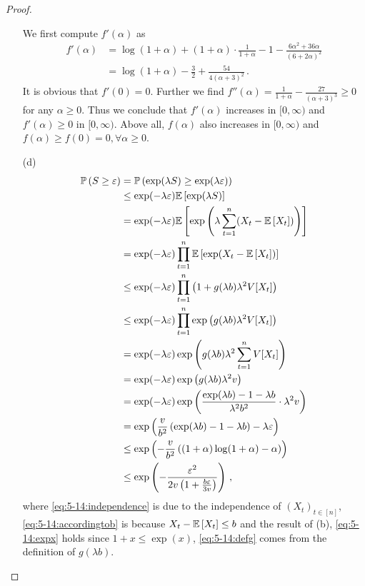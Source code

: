 \begin{proof}
\begin{enumerate}
		We first compute $f'(\alpha)$ as
		\begin{align*}
			f'(\alpha) &= \log(1+\alpha) + (1+\alpha)\cdot \frac{1}{1+\alpha} -1 - \frac{6\alpha^2 + 36 \alpha}{(6+2\alpha)^2} \\
			&= \log(1+\alpha) - \frac{3}{2} + \frac{54}{4 (\alpha+3)^2}\,. 
		\end{align*}
		It is obvious that $f'(0)=0$. Further we find $f''(\alpha) = \frac{1}{1+\alpha} - \frac{27}{(\alpha+3)^3} \ge 0$ for any $\alpha\ge 0$. Thus we conclude that $f'(\alpha)$ increases in $[0,\infty)$ and $f'(\alpha)\ge 0$ in $[0,\infty)$. Above all, $f(\alpha)$ also increases in $[0,\infty)$ and $f(\alpha)\ge f(0)=0, \forall \alpha \ge 0$. 
		\item[(d)]
		\begin{align}
			\mathbb{P} \left(S\ge \varepsilon\right) &= \mathbb{P} \left(\exp(\lambda S) \ge \exp(\lambda \varepsilon)\right) \notag\\
			&\le \exp(-\lambda \varepsilon) \mathbb{E} \left[\exp(\lambda S)\right] \notag\\
			&= \exp(-\lambda \varepsilon)\mathbb{E} \left[\exp\left(\lambda \sum_{t=1}^n (X_t - \mathbb{E} \left[X_t\right])\right)\right] \notag \\
			&= \exp(-\lambda \varepsilon) \prod_{t=1}^n \mathbb{E} \left[\exp (X_t - \mathbb{E} \left[X_t\right])\right] \label{eq:5-14:independence} \\
			&\le \exp(-\lambda \varepsilon)\prod_{t=1}^n \left(1+g(\lambda b)\lambda^2 V[X_t]\right) \label{eq:5-14:accordingtob} \\
			&\le \exp(-\lambda \varepsilon)\prod_{t=1}^n \exp\left(g(\lambda b)\lambda^2 V[X_t]\right) \label{eq:5-14:expx} \\
			&= \exp(-\lambda \varepsilon)\exp\left(g(\lambda b)\lambda^2 \sum_{t=1}^n V[X_t] \right) \notag\\
			&= \exp(-\lambda \varepsilon)\exp\left(g(\lambda b)\lambda^2 v \right) \notag \\
			&= \exp(-\lambda \varepsilon)\exp\left(\frac{\exp(\lambda b) -1-\lambda b}{\lambda^2 b^2}\cdot \lambda^2 v \right) \label{eq:5-14:defg} \\
			&= \exp\left( \frac{v}{b^2}\left(\exp(\lambda b )-1-\lambda b\right) -\lambda \varepsilon \right) \notag \\
			&\le \exp\left( -\frac{v}{b^2} \left( (1+\alpha)\log(1+\alpha) - \alpha \right) \right) \label{eq:5-14:calculate}\\
			&\le \exp\left(-\frac{\varepsilon^2}{2v\left(1+\frac{b\varepsilon}{3v}\right)} \right) \label{eq:5-14:accordingtoc} \,,
		\end{align}
		where \eqref{eq:5-14:independence} is due to the independence of $(X_t)_{t\in[n]}$, \eqref{eq:5-14:accordingtob} is because $X_t-\mathbb{E} \left[X_t\right] \le b$ and the result of (b), \eqref{eq:5-14:expx} holds since $1+x \le \exp(x)$, \eqref{eq:5-14:defg} comes from the definition of $g(\lambda b)$. 

\end{enumerate}
\end{proof}
